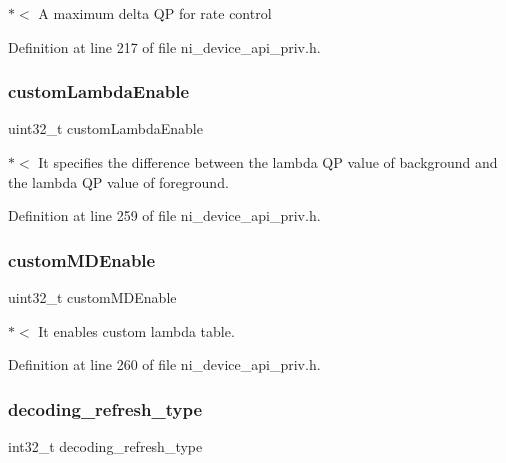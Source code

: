 $\ast$$<$ A maximum delta QP for rate control 

Definition at line 217 of file ni\+\_\+device\+\_\+api\+\_\+priv.\+h.

\mbox{\label{struct__ni__t408__config__t_a67b4e8ba87297673867d037c18c83c6a}} 
\subsubsection{\texorpdfstring{customLambdaEnable}{customLambdaEnable}}
{\footnotesize\ttfamily uint32\+\_\+t custom\+Lambda\+Enable}

$\ast$$<$ It specifies the difference between the lambda QP value of background and the lambda QP value of foreground. 

Definition at line 259 of file ni\+\_\+device\+\_\+api\+\_\+priv.\+h.

\mbox{\label{struct__ni__t408__config__t_afb4fc1c2a914bf4fbf647767653617c0}} 
\subsubsection{\texorpdfstring{customMDEnable}{customMDEnable}}
{\footnotesize\ttfamily uint32\+\_\+t custom\+M\+D\+Enable}

$\ast$$<$ It enables custom lambda table. 

Definition at line 260 of file ni\+\_\+device\+\_\+api\+\_\+priv.\+h.

\mbox{\label{struct__ni__t408__config__t_a536cda1521aab86fe11a8af60dfba81b}} 
\subsubsection{\texorpdfstring{decoding\_refresh\_type}{decoding\_refresh\_type}}
{\footnotesize\ttfamily int32\+\_\+t decoding\+\_\+refresh\+\_\+type}




